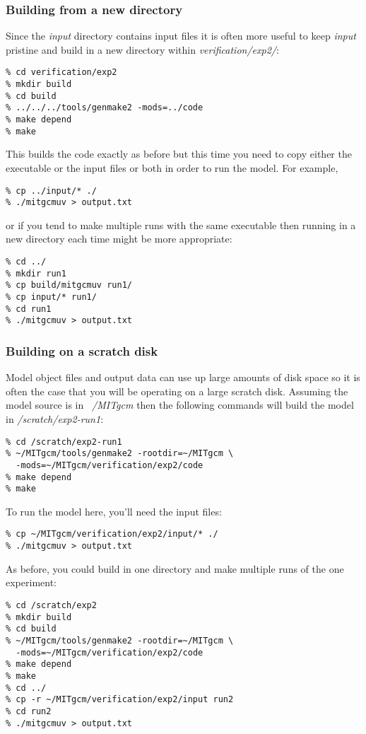 \subsubsection{Building from a new directory}

Since the {\em input} directory contains input files it is often more
useful to keep {\em input} pristine and build in a new directory
within {\em verification/exp2/}:
\begin{verbatim}
% cd verification/exp2
% mkdir build
% cd build
% ../../../tools/genmake2 -mods=../code
% make depend
% make
\end{verbatim}
This builds the code exactly as before but this time you need to copy
either the executable or the input files or both in order to run the
model. For example,
\begin{verbatim}
% cp ../input/* ./
% ./mitgcmuv > output.txt
\end{verbatim}
or if you tend to make multiple runs with the same executable then
running in a new directory each time might be more appropriate:
\begin{verbatim}
% cd ../
% mkdir run1
% cp build/mitgcmuv run1/
% cp input/* run1/
% cd run1
% ./mitgcmuv > output.txt
\end{verbatim}

\subsubsection{Building on a scratch disk}

Model object files and output data can use up large amounts of disk
space so it is often the case that you will be operating on a large
scratch disk. Assuming the model source is in {\em ~/MITgcm} then the
following commands will build the model in {\em /scratch/exp2-run1}:
\begin{verbatim}
% cd /scratch/exp2-run1
% ~/MITgcm/tools/genmake2 -rootdir=~/MITgcm \
  -mods=~/MITgcm/verification/exp2/code
% make depend
% make
\end{verbatim}
To run the model here, you'll need the input files:
\begin{verbatim}
% cp ~/MITgcm/verification/exp2/input/* ./
% ./mitgcmuv > output.txt
\end{verbatim}

As before, you could build in one directory and make multiple runs of
the one experiment:
\begin{verbatim}
% cd /scratch/exp2
% mkdir build
% cd build
% ~/MITgcm/tools/genmake2 -rootdir=~/MITgcm \
  -mods=~/MITgcm/verification/exp2/code
% make depend
% make
% cd ../
% cp -r ~/MITgcm/verification/exp2/input run2
% cd run2
% ./mitgcmuv > output.txt
\end{verbatim}


